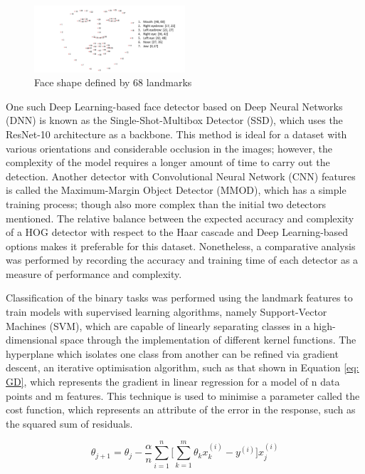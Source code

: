 \documentclass[conference]{IEEEtran}
\begin{document}
\begin{figure} [h] %
  \centering
    \includegraphics[width=0.5\textwidth]{graphs/landmarks} 
    \caption{Face shape defined by 68 landmarks}
    \label{fig: landmarks}
\end{figure}

One such Deep Learning-based face detector based on Deep Neural Networks (DNN) is known as the Single-Shot-Multibox Detector (SSD), which uses the ResNet-10 architecture as a backbone. This method is ideal for a dataset with various orientations and considerable occlusion in the images; however, the complexity of the model requires a longer amount of time to carry out the detection.
Another detector with Convolutional Neural Network (CNN) features is called the Maximum-Margin Object Detector (MMOD), which has a simple training process; though also more complex than the initial two detectors mentioned.
The relative balance between the expected accuracy and complexity of a HOG detector with respect to the Haar cascade and Deep Learning-based options makes it preferable for this dataset. Nonetheless, a comparative analysis was performed by recording the accuracy and training time of each detector as a measure of performance and complexity.

Classification of the binary tasks was performed using the landmark features to train models with supervised learning algorithms, namely Support-Vector Machines (SVM), which are capable of linearly separating classes in a high-dimensional space through the implementation of different kernel functions. 
The hyperplane which isolates one class from another can be refined via gradient descent, an iterative optimisation algorithm, such as that shown in Equation \ref{eq: GD}, which represents the gradient in linear regression for a model of n data points and m features. This technique is used to minimise a parameter called the cost function, which represents an attribute of the error in the response, such as the squared sum of residuals.

\begin{equation}
\theta_{j+1} = \theta_j - \frac{\alpha}{n} \sum_{i=1}^n \bigg[\sum_{k=1}^m \theta_k x_k^{(i)} - y^{(i)} \bigg] x_j^{(i)} 
\label{eq: GD}
\end{equation}
\end{document}
